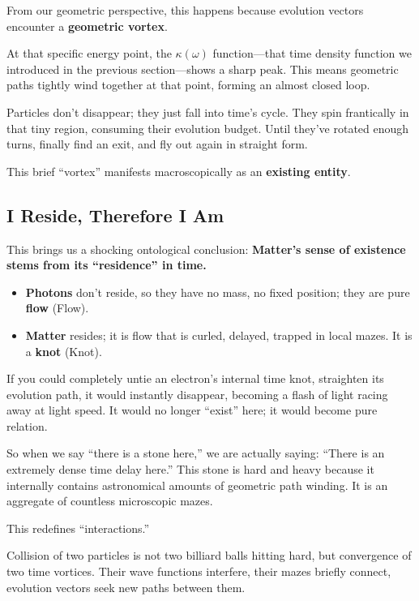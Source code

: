 \documentclass[11pt,a4paper,twoside]{book}
\begin{document}
From our geometric perspective, this happens because evolution vectors encounter a \textbf{geometric vortex}.

At that specific energy point, the $\kappa(\omega)$ function---that time density function we introduced in the previous section---shows a sharp peak. This means geometric paths tightly wind together at that point, forming an almost closed loop.

Particles don't disappear; they just fall into time's cycle. They spin frantically in that tiny region, consuming their evolution budget. Until they've rotated enough turns, finally find an exit, and fly out again in straight form.

This brief ``vortex'' manifests macroscopically as an \textbf{existing entity}.

\subsection{I Reside, Therefore I Am}

This brings us a shocking ontological conclusion: \textbf{Matter's sense of existence stems from its ``residence'' in time.}

\begin{itemize}
\item \textbf{Photons} don't reside, so they have no mass, no fixed position; they are pure \textbf{flow} (Flow).

\item \textbf{Matter} resides; it is flow that is curled, delayed, trapped in local mazes. It is a \textbf{knot} (Knot).
\end{itemize}

If you could completely untie an electron's internal time knot, straighten its evolution path, it would instantly disappear, becoming a flash of light racing away at light speed. It would no longer ``exist'' here; it would become pure relation.

So when we say ``there is a stone here,'' we are actually saying: ``There is an extremely dense time delay here.'' This stone is hard and heavy because it internally contains astronomical amounts of geometric path winding. It is an aggregate of countless microscopic mazes.

This redefines ``interactions.''

Collision of two particles is not two billiard balls hitting hard, but convergence of two time vortices. Their wave functions interfere, their mazes briefly connect, evolution vectors seek new paths between them.
\end{document}
